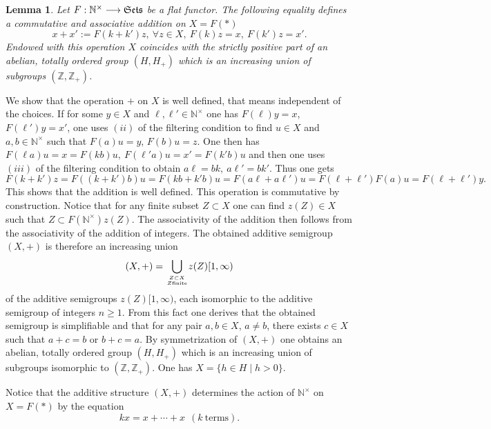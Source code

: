\documentclass[noams,lp]{compositio}
\newtheorem{lem}[thm]{Lemma}
\def\N{{\mathbb N}}
\def\Z{{\mathbb Z}}
\def\Se{\frak{ Sets}}
\def\nt{\N^{\times}}
\begin{document}
\begin{lem}\label{flat1} Let $F: \N^\times\longrightarrow \Se$ be a flat functor. The following equality defines a commutative and associative addition  on $X=F(\ast)$ 
\begin{equation}\label{defnsum}
x+x':=F(k+k')z, \ \forall z\in X, \  F(k)z=x, \  F(k')z=x'.
\end{equation}
Endowed with this operation $X$ coincides with the strictly positive part of an abelian, totally ordered group  $(H,H_+)$ which is an increasing union of subgroups $(\Z,\Z_+)$.
\end{lem}
\proof We show that the operation $+$ on $X$ is well defined, that means independent of the choices. 
If for some $y\in X$ and $\ell,\ell'\in \nt$ one has  $F(\ell)y=x$, $F(\ell')y=x'$, one uses $(ii)$ of the filtering condition to find $u\in X$ and $a,b\in \N^\times$ such that 
$
F(a)u=y, \, F(b)u=z
$. 
One then has 
$
F(\ell a)u=x=F(kb)u, ~ F(\ell' a)u=x'=F(k'b)u
$
and then one uses $(iii)$ of the filtering condition to obtain 
$
a\ell=bk,  ~a\ell'=bk'
$.
Thus one gets
$$F(k+k')z=F((k+k')b)u= F(kb+k'b)u=F(a\ell+a \ell')u=F(\ell+\ell')F(a)u=F(\ell+\ell')y.$$
This shows that the addition is well defined. This operation is commutative by construction. Notice that for any finite subset $Z\subset X$ one can find $z(Z)\in X$ such that $Z\subset F(\nt) z(Z)$. The associativity of the addition then follows from the associativity of the addition of integers. The obtained additive semigroup $(X,+)$ is therefore an increasing union
$$
(X,+)=\displaystyle{\bigcup_{Z\subset X\atop Z \rm{finite}}} z(Z)[1,\infty)
$$ 
of the additive semigroups $z(Z)[1,\infty)$, each isomorphic to the  additive semigroup of integers $n\geq 1$.
From this fact one derives that the obtained semigroup is simplifiable and that for any  pair  $a,b\in X$, $a\neq b$, there  exists $c\in X$ such that $a+c=b$ or $b+c=a$. By symmetrization of  $(X,+)$ one obtains  an abelian, totally ordered group  $(H,H_+)$ which is an increasing union of subgroups isomorphic to $(\Z,\Z_+)$. One has $X=\{h\in H\mid h>0\}$. \endproof


Notice that the additive structure $(X,+)$ determines the action of  $\N^\times$ on $X=F(\ast)$ by the equation
$$
kx= x+\cdots +x \  \  (k \ \text{terms}).
$$
\end{document}

